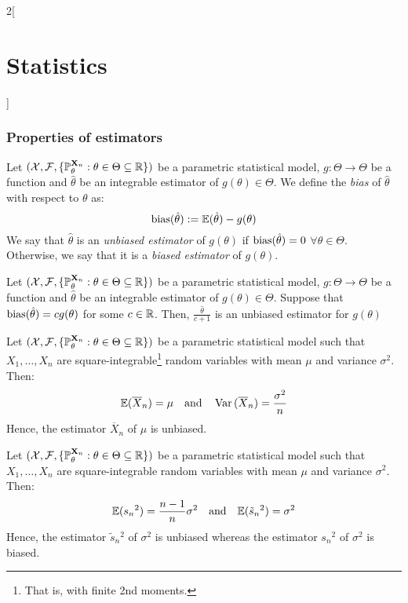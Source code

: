 \documentclass[../../../main.tex]{subfiles}
\begin{document}
\begin{multicols}{2}[\section{Statistics}]
  \subsubsection{Properties of estimators}
  \begin{definition}[Bias]
    Let $(\mathcal{X},\mathcal{F},\{\mathbb{P}_{\theta}^{\boldsymbol{\mathrm{X}}_n}:{\theta}\in\Theta\subseteq \mathbb{R}\})$ be a parametric statistical model, $g:\Theta\rightarrow\Theta$ be a function and ${\hat\theta}$ be an integrable estimator of $g({\theta})\in\Theta$. We define the \emph{bias} of ${\hat\theta}$ with respect to ${\theta}$ as: $$\operatorname{bias}({\hat\theta}):=\mathbb{E}({\hat\theta})-g({\theta})$$ We say that ${\hat\theta}$ is an \emph{unbiased estimator} of $g({\theta})$ if $\operatorname{bias}({\hat\theta})=0$ $\forall\theta\in\Theta$. Otherwise, we say that it is a \emph{biased estimator} of $g({\theta})$.
  \end{definition}
  \begin{proposition}
    Let $(\mathcal{X},\mathcal{F},\{\mathbb{P}_{\theta}^{\boldsymbol{\mathrm{X}}_n}:{\theta}\in\Theta\subseteq \mathbb{R}\})$ be a parametric statistical model, $g:\Theta\rightarrow\Theta$ be a function and ${\hat\theta}$ be an integrable estimator of $g({\theta})\in\Theta$. Suppose that $\operatorname{bias}(\hat\theta)=cg(\theta)$ for some $c\in\mathbb{R}$. Then, $\frac{\hat\theta}{c+1}$ is an unbiased estimator for $g(\theta)$
  \end{proposition}
  \begin{proposition}
    Let $(\mathcal{X},\mathcal{F},\{\mathbb{P}_{\theta}^{\boldsymbol{\mathrm{X}}_n}:{\theta}\in\Theta\subseteq \mathbb{R}\})$ be a parametric statistical model such that $X_1,\ldots,X_n$ are square-integrable\footnote{That is, with finite 2nd moments.} \iid random variables with mean $\mu$ and variance $\sigma^2$. Then: $$\mathbb{E}(\overline{X}_n)=\mu\quad\text{and}\quad\operatorname{Var}{(\overline{X}_n)}=\frac{\sigma^2}{n}$$
    Hence, the estimator $\overline{X}_n$ of $\mu$ is unbiased.
  \end{proposition}
  \begin{proposition}
    Let $(\mathcal{X},\mathcal{F},\{\mathbb{P}_{\theta}^{\boldsymbol{\mathrm{X}}_n}:{\theta}\in\Theta\subseteq \mathbb{R}\})$ be a parametric statistical model such that $X_1,\ldots,X_n$ are square-integrable \iid random variables with mean $\mu$ and variance $\sigma^2$. Then: $$\mathbb{E}({s_n}^2)=\frac{n-1}{n}\sigma^2\quad\text{and}\quad\mathbb{E}(\tilde{s}_n{}^2)=\sigma^2$$
    Hence, the estimator $\tilde{s}_n{}^2$ of $\sigma^2$ is unbiased whereas the estimator ${s_n}^2$ of $\sigma^2$ is biased.
  \end{proposition}
  \begin{definition}

\end{definition}
\end{multicols}
\end{document}
